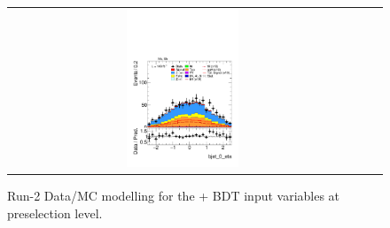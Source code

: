 \begin{figure}[htbp]
\begin{tabular}{@{}c c c@{}}
    \includegraphics[width=0.33\textwidth]{images/plots_modelling_run2_run3_variables/run_2_tth/plot_bjet_0_eta_hh_tth_15_16_17_18.pdf}
  \end{tabular}

  \caption{Run-2 Data/MC modelling for the \thqb + \ttH BDT input variables at preselection level.}
  \label{tth_vars_modelling_run2_2}
\end{figure}

